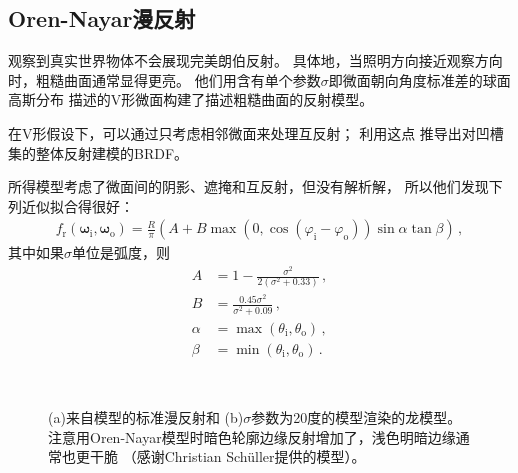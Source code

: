 \subsection{Oren-Nayar漫反射}\label{sub:Oren-Nayar漫反射}
\citet{10.1145/192161.192213}观察到真实世界物体不会展现完美朗伯反射。
具体地，当照明方向接近观察方向时，粗糙曲面通常显得更亮。
他们用含有单个参数$\sigma$即微面朝向角度标准差的球面高斯分布
描述的V形微面构建了描述粗糙曲面的反射模型。

在V形假设下，可以通过只考虑相邻微面来处理互反射；
\citeauthor{10.1145/192161.192213}利用这点
推导出对凹槽集的整体反射建模的BRDF。

所得模型考虑了微面间的阴影、遮掩和互反射，但没有解析解，
所以他们发现下列近似拟合得很好：
\begin{align*}
    f_{\mathrm{r}}({\bm\omega}_{\mathrm{i}},{\bm\omega}_{\mathrm{o}})=\frac{R}{\pi}(A+B\max(0,\cos(\varphi_{\mathrm{i}}-\varphi_{\mathrm{o}}))\sin\alpha\tan\beta)\, ,
\end{align*}
其中如果$\sigma$单位是弧度，则
\begin{align*}
    A      & =1-\frac{\sigma^2}{2(\sigma^2+0.33)}\, ,           \\
    B      & =\frac{0.45\sigma^2}{\sigma^2+0.09}\, ,            \\
    \alpha & =\max(\theta_{\mathrm{i}},\theta_{\mathrm{o}})\, , \\
    \beta  & =\min(\theta_{\mathrm{i}},\theta_{\mathrm{o}})\, .
\end{align*}

\begin{figure}[htbp]
    \centering
    \\
    \caption{(a)来自模型的标准漫反射和
        (b)$\sigma$参数为20度的模型渲染的龙模型。
        注意用Oren-Nayar模型时暗色轮廓边缘反射增加了，浅色明暗边缘通常也更干脆
        （感谢Christian Schüller提供的模型）。}
    \label{fig:8.14}
\end{figure}

